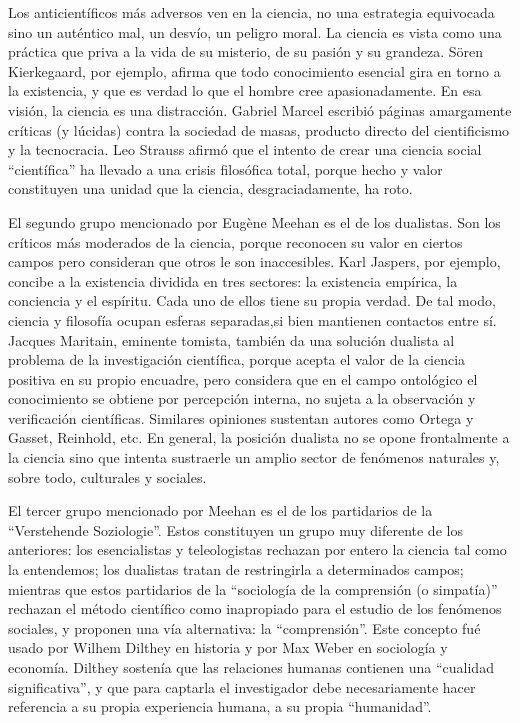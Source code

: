 \documentclass[
]{book}
\begin{document}
Los anticientíficos más adversos ven en la ciencia, no una estrategia equivocada sino un auténtico mal, un desvío, un peligro moral. La ciencia es vista como una práctica que priva a la vida de su misterio, de su pasión y su grandeza. Sören Kierkegaard, por ejemplo, afirma que todo conocimiento esencial gira en torno a la existencia, y que es verdad lo que el hombre cree apasionadamente. En esa visión, la ciencia es una distracción. Gabriel Marcel escribió páginas amargamente críticas (y lúcidas) contra la sociedad de masas, producto directo del cientificismo y la tecnocracia. Leo Strauss afirmó que el intento de crear una ciencia social ``científica'' ha llevado a una crisis filosófica total, porque hecho y valor constituyen una unidad que la ciencia, desgraciadamente, ha roto.

El segundo grupo mencionado por Eugène Meehan es el de los dualistas. Son los críticos más moderados de la ciencia, porque reconocen su valor en ciertos campos pero consideran que otros le son inaccesibles. Karl Jaspers, por ejemplo, concibe a la existencia dividida en tres sectores: la existencia empírica, la conciencia y el espíritu. Cada uno de ellos tiene su propia verdad. De tal modo, ciencia y filosofía ocupan esferas separadas,si bien mantienen contactos entre sí. Jacques Maritain, eminente tomista, también da una solución dualista al problema de la investigación científica, porque acepta el valor de la ciencia positiva en su propio encuadre, pero considera que en el campo ontológico el conocimiento se obtiene por percepción interna, no sujeta a la observación y verificación científicas. Similares opiniones sustentan autores como Ortega y Gasset, Reinhold, etc. En general, la posición dualista no se opone frontalmente a la ciencia sino que intenta sustraerle un amplio sector de fenómenos naturales y, sobre todo, culturales y sociales.

El tercer grupo mencionado por Meehan es el de los partidarios de la ``Verstehende Soziologie''. Estos constituyen un grupo muy diferente de los anteriores: los esencialistas y teleologistas rechazan por entero la ciencia tal como la entendemos; los dualistas tratan de restringirla a determinados campos; mientras que estos partidarios de la ``sociología de la comprensión (o simpatía)'' rechazan el método científico como inapropiado para el estudio de los fenómenos sociales, y proponen una vía alternativa: la ``comprensión''. Este concepto fué usado por Wilhem Dilthey en historia y por Max Weber en sociología y economía. Dilthey sostenía que las relaciones humanas contienen una ``cualidad significativa'', y que para captarla el investigador debe necesariamente hacer referencia a su propia experiencia humana, a su propia ``humanidad''.
\end{document}
